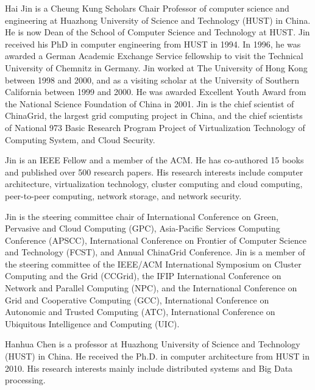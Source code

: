 \documentclass{ieeeaccess}
\begin{document}
\begin{IEEEbiography}{Hai Jin} is a Cheung Kung Scholars Chair Professor of computer science and engineering at Huazhong University of Science and Technology (HUST) in China. He is now Dean of the School of Computer Science and Technology at HUST. Jin received his PhD in computer engineering from HUST in 1994. In 1996, he was awarded a German Academic Exchange Service fellowship to visit the Technical University of Chemnitz in Germany. Jin worked at The University of Hong Kong between 1998 and 2000, and as a visiting scholar at the University of Southern California between 1999 and 2000. He was awarded Excellent Youth Award from the National Science Foundation of China in 2001. Jin is the chief scientist of ChinaGrid, the largest grid computing project in China, and the chief scientists of National 973 Basic Research Program Project of Virtualization Technology of Computing System, and Cloud Security.
	
Jin is an IEEE Fellow and a member of the ACM. He has co-authored 15 books and published over 500 research papers. His research interests include computer architecture, virtualization technology, cluster computing and cloud computing, peer-to-peer computing, network storage, and network security.
	
Jin is the steering committee chair of International Conference on Green, Pervasive and Cloud Computing (GPC), Asia-Pacific Services Computing Conference (APSCC), International Conference on Frontier of Computer Science and Technology (FCST), and Annual ChinaGrid Conference. Jin is a member of the steering committee of the IEEE/ACM International Symposium on Cluster Computing and the Grid (CCGrid), the IFIP International Conference on Network and Parallel Computing (NPC), and the International Conference on Grid and Cooperative Computing (GCC), International Conference on Autonomic and Trusted Computing (ATC), International Conference on Ubiquitous Intelligence and Computing (UIC).
\end{IEEEbiography}

\begin{IEEEbiography}{Hanhua Chen} is a professor at Huazhong University of Science and Technology (HUST) in China. He received the  Ph.D. in computer architecture from HUST in 2010. His research interests mainly include distributed systems and Big Data processing.
\end{IEEEbiography}


\EOD
\end{document}

